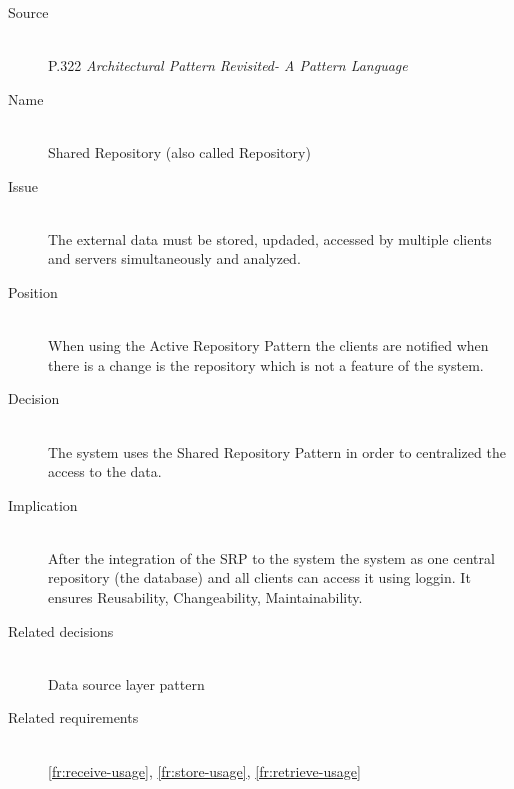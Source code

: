 \begin{description}
\item [Source]~\\
\EAA P.322 \cite{eaa}
\textit{Architectural Pattern Revisited- A Pattern Language} \\

 \item [Name]~\\ Shared Repository (also called Repository) \\
 \item [Issue]~\\ The external data must be stored, updaded, accessed by multiple clients and servers simultaneously and analyzed.\\
 \item [Position]~\\ When using the Active Repository Pattern the clients are notified when there is a change is the repository which is not a feature of the system.\\
 \item [Decision]~\\ The system uses the Shared Repository Pattern in order to centralized the access to the data.\\
 \item [Implication]~\\ After the integration of the SRP to the system the system as one central repository (the database) and all clients can access it using loggin. It ensures Reusability, Changeability, Maintainability. \\
\item [Related decisions]~\\ Data source layer pattern \\
\item [Related requirements]~\\ 
\ref{fr:receive-usage}, \ref{fr:store-usage}, \ref{fr:retrieve-usage} \\
 
 \end{description}



